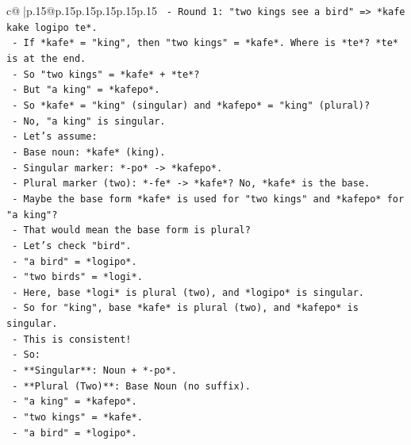 \documentclass{article}
\begin{document}
{\begin{supertabular}{c@{$\;$}|p{.15\linewidth}@{}p{.15\linewidth}p{.15\linewidth}p{.15\linewidth}p{.15\linewidth}p{.15\linewidth}}
{{{\texttt{              {-} Round 1: "two kings see a bird" => *kafe kake logipo te*.} \\
\texttt{                {-} If *kafe* = "king", then "two kings" = *kafe*. Where is *te*? *te* is at the end.} \\
\texttt{                {-} So "two kings" = *kafe* + *te*?} \\
\texttt{                {-} But "a king" = *kafepo*.} \\
\texttt{                {-} So *kafe* = "king" (singular) and *kafepo* = "king" (plural)?} \\
\texttt{                {-} No, "a king" is singular.} \\
\texttt{                {-} Let's assume:} \\
\texttt{                  {-} Base noun: *kafe* (king).} \\
\texttt{                  {-} Singular marker: *{-}po* {-}> *kafepo*.} \\
\texttt{                  {-} Plural marker (two): *{-}fe* {-}> *kafe*? No, *kafe* is the base.} \\
\texttt{                  {-} Maybe the base form *kafe* is used for "two kings" and *kafepo* for "a king"?} \\
\texttt{                  {-} That would mean the base form is plural?} \\
\texttt{                  {-} Let's check "bird".} \\
\texttt{                  {-} "a bird" = *logipo*.} \\
\texttt{                  {-} "two birds" = *logi*.} \\
\texttt{                  {-} Here, base *logi* is plural (two), and *logipo* is singular.} \\
\texttt{                  {-} So for "king", base *kafe* is plural (two), and *kafepo* is singular.} \\
\texttt{                  {-} This is consistent!} \\
\texttt{                  {-} So:} \\
\texttt{                    {-} **Singular**: Noun + *{-}po*.} \\
\texttt{                    {-} **Plural (Two)**: Base Noun (no suffix).} \\
\texttt{                  {-} "a king" = *kafepo*.} \\
\texttt{                  {-} "two kings" = *kafe*.} \\
\texttt{                  {-} "a bird" = *logipo*.} \\
}}}
\end{supertabular}}
\end{document}
